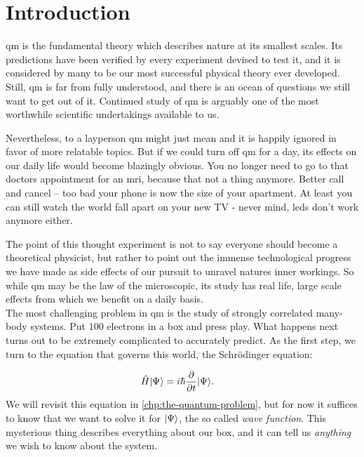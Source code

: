 \documentclass[Thesis.tex]{subfiles}
\begin{document}
\chapter{Introduction}
\label{chp:introduction}

\Gls{qm} is the fundamental theory which describes nature at its
smallest scales. Its predictions have been verified by every experiment
devised to test it, and it is considered by many to be our most successful physical
theory ever developed. Still, \gls{qm} is far from fully understood, and there is an ocean of
questions we still want to get out of it. Continued study of \gls{qm} is arguably one
of the most worthwhile scientific undertakings available to us.

Nevertheless, to a layperson \acrshort{qm} might just mean  and it
is happily ignored in favor of more relatable topics. But if we could turn off \gls{qm}
for a day, its effects on our daily life would become blazingly obvious. You no
longer need to go to that doctors appointment for an \acrshort{mri}, because that not a
thing anymore. Better call and cancel -- too bad your phone is now the size of
your apartment. At least you can still watch the world fall apart on your new TV -
never mind, \acrshort{led}s don't work anymore either.

The point of this thought experiment is not to say everyone should become a
theoretical physicist, but rather to point out the immense technological
progress we have made as side effects of our pursuit to unravel natures inner
workings. So while \acrshort{qm} may be the law of the microscopic, its study
has real life, large scale effects from which we benefit on a daily basis.\\

The most challenging problem in \gls{qm} is the study of strongly correlated
many-body systems. Put $\num{100}$ electrons in a box and press play. What happens next
turns out to be extremely complicated to accurately predict. As the first step, we
turn to the equation that governs this world, the Schrödinger equation:

\begin{align}
  \label{eq:schrodinger-intro-def}
  \hat H| \Psi \rangle &= i\hbar \pdv{}{t}| \Psi \rangle.
\end{align}
We will revisit this equation in \cref{chp:the-quantum-problem}, but for now it
suffices to know that we want to solve it for $| \Psi \rangle$, the so called \emph{wave
function}. This mysterious thing describes everything about our box, and it can
tell us \emph{anything} we wish to know about the system.
\end{document}

